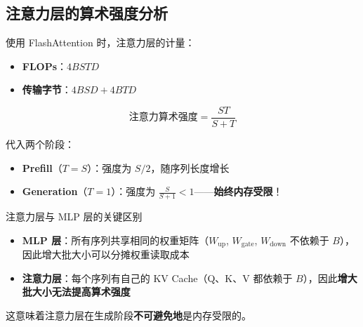 \subsection{注意力层的算术强度分析}

使用 FlashAttention 时，注意力层的计量：

\begin{itemize}
    \item \textbf{FLOPs}：$4BSTD$
    \item \textbf{传输字节}：$4BSD + 4BTD$
\end{itemize}

$$\text{注意力算术强度} = \frac{ST}{S + T}$$

代入两个阶段：

\begin{itemize}
    \item \textbf{Prefill}（$T = S$）：强度为 $S/2$，随序列长度增长
    \item \textbf{Generation}（$T = 1$）：强度为 $\frac{S}{S+1} < 1$——\textbf{始终内存受限}！
\end{itemize}

\begin{warningbox}{注意力层与 MLP 层的关键区别}
\begin{itemize}
    \item \textbf{MLP 层}：所有序列共享相同的权重矩阵（$W_\text{up}$, $W_\text{gate}$, $W_\text{down}$ 不依赖于 $B$），因此增大批大小可以分摊权重读取成本
    \item \textbf{注意力层}：每个序列有自己的 KV Cache（Q、K、V 都依赖于 $B$），因此\textbf{增大批大小无法提高算术强度}
\end{itemize}
这意味着注意力层在生成阶段\textbf{不可避免地}是内存受限的。
\end{warningbox}

